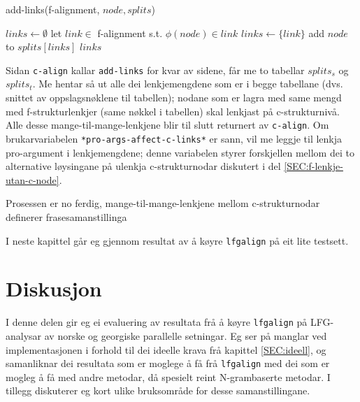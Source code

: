 \documentclass[11pt,a4paper,oneside,draft]{book}
\begin{document}
   \begin{algorithm}[]
   \caption{add-links(f-alignment, $node, splits$)}
   \label{algo:add-links}
      
        $links \gets \emptyset$\;
    {
        {
          let $link \in$ f-alignment s.t. $\phi(node) \in link$ \;
           {$links \gets \{link\}$} \;
           {
          }
        }
        add $node$ to $splits[links]$ \;
       }
        \Return $links$ \;
  \end{algorithm}

Sidan \texttt{c-align} kallar \texttt{add-links} for kvar av sidene, får me to
tabellar $splits_s$ og $splits_t$.  Me hentar så ut alle dei
lenkjemengdene som er i begge tabellane (dvs. snittet av
oppslagsnøklene til tabellen); nodane som er lagra med same mengd med
f-strukturlenkjer (same nøkkel i tabellen) skal lenkjast på
c-strukturnivå. Alle desse mange-til-mange-lenkjene blir til slutt
returnert av \texttt{c-align}. Om brukarvariabelen
\texttt{*pro-args-affect-c-links*} er sann, vil me leggje til lenkja
pro-argument i lenkjemengdene; denne variabelen styrer forskjellen
mellom dei to alternative løysingane på ulenkja c-strukturnodar
diskutert i del \ref{SEC:f-lenkje-utan-c-node}.

Prosessen er no ferdig, mange-til-mange-lenkjene mellom
c-strukturnodar definerer frasesamanstillinga

I neste kapittel går eg gjennom resultat av å køyre \texttt{lfgalign} på eit
lite testsett. 


\chapter{Diskusjon}
\label{sec-5}

\label{SEC:diskusjon}



 I denne delen gir eg ei evaluering av resultata frå å køyre
 \texttt{lfgalign} på LFG-analysar av norske og georgiske parallelle
 setningar. Eg ser på manglar ved implementasjonen i forhold til dei
 ideelle krava frå kapittel \ref{SEC:ideell}, og samanliknar dei
 resultata som er moglege å få frå \texttt{lfgalign} med dei som er mogleg å
 få med andre metodar, då spesielt reint N-grambaserte metodar. I
 tillegg diskuterer eg kort ulike bruksområde for desse
 samanstillingane.
\end{document}
